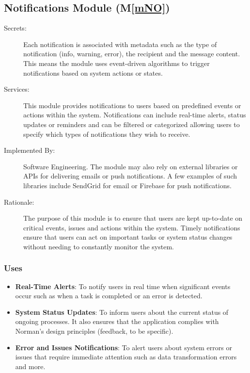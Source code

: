 \documentclass[12pt, titlepage]{article}
\newcommand{\mref}[1]{M\ref{#1}}
\begin{document}
\subsection{Notifications Module (\mref{mNO})}
\begin{description}
  \item[Secrets:] Each notification is associated with metadata such as the type of notification 
  (info, warning, error), the recipient and the message content. This means the module uses 
  event-driven algorithms to trigger notifications based on system actions or states. 
  \item[Services:] This module provides notifications to users based on predefined events or actions 
  within the system. Notifications can include real-time alerts, status updates or reminders and 
  can be filtered or categorized allowing users to specify which types of notifications they 
  wish to receive.
  \item[Implemented By:] Software Engineering. The module may also rely on external libraries or APIs 
  for delivering emails or push notifications. A few examples of such libraries include SendGrid for email 
  or Firebase for push notifications.
  \item[Rationale:] The purpose of this module is to ensure that users are kept up-to-date on critical 
  events, issues and actions within the system. Timely notifications ensure that users can act on 
  important tasks or system status changes without needing to constantly monitor the system.
\end{description}

\subsubsection{Uses}
\begin{itemize}
  \item \textbf{Real-Time Alerts}: To notify users in real time when significant events occur such as 
  when a task is completed or an error is detected.
  \item \textbf{System Status Updates}: To inform users about the current status of ongoing processes. It 
  also ensures that the application complies with Norman's design principles (feedback, to be specific).
  \item \textbf{Error and Issues Notifications}: To alert users about system errors or issues that require 
  immediate attention such as data transformation errors and more.
\end{itemize}
\end{document}
